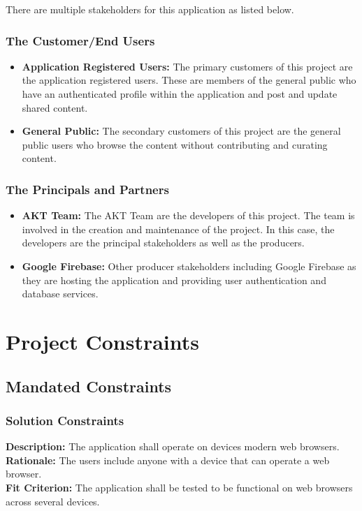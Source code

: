 \documentclass[12pt,fleqn]{article}
\begin{document}
There are multiple stakeholders for this application as listed below.

\subsubsection* {The Customer/End Users}
\begin{itemize} 
\item \textbf{Application Registered Users: }The primary customers of this project are the application registered users. These are members of the general public who have an authenticated profile within the application and post and update shared content.
\item \textbf{General Public: }The secondary customers of this project are the general public users who browse the content without contributing and curating content.
\end{itemize}
\subsubsection* {The Principals and Partners}
\begin{itemize}
    \item \textbf{AKT Team: } The AKT Team are the developers of this project.  The team is involved in the creation and maintenance of the project.  In this case, the developers are the principal stakeholders as well as the producers.
    \item \textbf{Google Firebase: } Other producer stakeholders including Google Firebase as they are hosting the application and providing user authentication and database services.
\end{itemize}



\pagebreak

\section {Project Constraints}

\subsection {Mandated Constraints}
\subsubsection{Solution Constraints}
\begin{tcolorbox}
\textbf{Description:} The application shall operate on devices modern web browsers.
\\
\textbf{Rationale:} The users include anyone with a device that can operate a web browser.
\\
\textbf{Fit Criterion:} The application shall be tested to be functional on web browsers across several devices.
\end{tcolorbox}
\end{document}
